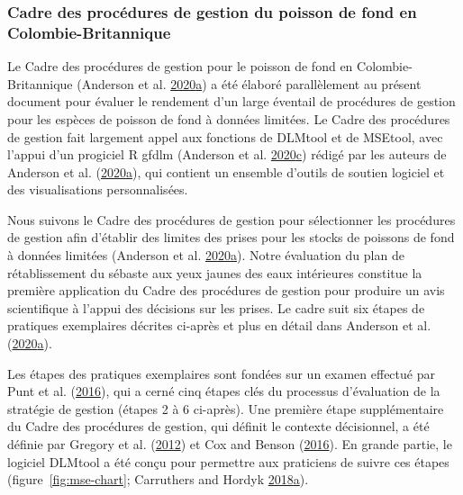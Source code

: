 \documentclass[11pt]{book}
\begin{document}
\hypertarget{sec:introduction-mp-framework}{%
\subsubsection{Cadre des procédures de gestion du poisson de fond en Colombie-Britannique}\label{sec:introduction-mp-framework}}

Le Cadre des procédures de gestion pour le poisson de fond en Colombie-Britannique (Anderson et al. \protect\hyperlink{ref-anderson2020gfmp}{2020}\protect\hyperlink{ref-anderson2020gfmp}{a}) a été élaboré parallèlement au présent document pour évaluer le rendement d'un large éventail de procédures de gestion pour les espèces de poisson de fond à données limitées. Le Cadre des procédures de gestion fait largement appel aux fonctions de DLMtool et de MSEtool, avec l'appui d'un progiciel R gfdlm (Anderson et al. \protect\hyperlink{ref-gfdlm}{2020}\protect\hyperlink{ref-gfdlm}{c}) rédigé par les auteurs de Anderson et al. (\protect\hyperlink{ref-anderson2020gfmp}{2020}\protect\hyperlink{ref-anderson2020gfmp}{a}), qui contient un ensemble d'outils de soutien logiciel et des visualisations personnalisées.

Nous suivons le Cadre des procédures de gestion pour sélectionner les procédures de gestion afin d'établir des limites des prises pour les stocks de poissons de fond à données limitées (Anderson et al. \protect\hyperlink{ref-anderson2020gfmp}{2020}\protect\hyperlink{ref-anderson2020gfmp}{a}). Notre évaluation du plan de rétablissement du sébaste aux yeux jaunes des eaux intérieures constitue la première application du Cadre des procédures de gestion pour produire un avis scientifique à l'appui des décisions sur les prises. Le cadre suit six étapes de pratiques exemplaires décrites ci-après et plus en détail dans Anderson et al. (\protect\hyperlink{ref-anderson2020gfmp}{2020}\protect\hyperlink{ref-anderson2020gfmp}{a}).

Les étapes des pratiques exemplaires sont fondées sur un examen effectué par Punt et al. (\protect\hyperlink{ref-punt2016}{2016}), qui a cerné cinq étapes clés du processus d'évaluation de la stratégie de gestion (étapes 2 à 6 ci-après). Une première étape supplémentaire du Cadre des procédures de gestion, qui définit le contexte décisionnel, a été définie par Gregory et al. (\protect\hyperlink{ref-gregory2012}{2012}) et Cox and Benson (\protect\hyperlink{ref-cox2016}{2016}). En grande partie, le logiciel DLMtool a été conçu pour permettre aux praticiens de suivre ces étapes (figure~\ref{fig:mse-chart}; Carruthers and Hordyk \protect\hyperlink{ref-carruthers2018}{2018}\protect\hyperlink{ref-carruthers2018}{a}).
\end{document}
